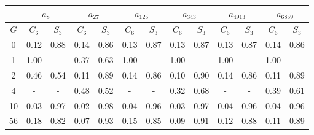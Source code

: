 \begin{table}[h]
   \begin{center}
        \begin{tabular}{c|c|c|c|c|c|c|c|c|c|c|c|c}
            \toprule
            & \multicolumn{2}{c|}{$a_{8}$} & \multicolumn{2}{c|}{$a_{27}$} & \multicolumn{2}{c|}{$a_{125}$} & \multicolumn{2}{c|}{$a_{343}$} & \multicolumn{2}{c|}{$a_{4913}$} & \multicolumn{2}{c}{$a_{6859}$} \\
            \midrule
            $G$ & $C_{6}$ & $S_{3}$ & $C_{6}$ & $S_{3}$ & $C_{6}$ & $S_{3}$ & $C_{6}$ & $S_{3}$ & $C_{6}$ & $S_{3}$ & $C_{6}$ & $S_{3}$ \\
            \midrule
            0 & 0.12 & 0.88 & 0.14 & 0.86 & 0.13 & 0.87 & 0.13 & 0.87 & 0.13 & 0.87 & 0.14 & 0.86 \\
            1 & 1.00 & - & 0.37 & 0.63 & 1.00 & - & 1.00 & - & 1.00 & - & 1.00 & - \\
            2 & 0.46 & 0.54 & 0.11 & 0.89 & 0.14 & 0.86 & 0.10 & 0.90 & 0.14 & 0.86 & 0.11 & 0.89 \\
            4 & - & - & 0.48 & 0.52 & - & - & 0.32 & 0.68 & - & - & 0.39 & 0.61 \\
            10 & 0.03 & 0.97 & 0.02 & 0.98 & 0.04 & 0.96 & 0.03 & 0.97 & 0.04 & 0.96 & 0.04 & 0.96 \\
            56 & 0.18 & 0.82 & 0.07 & 0.93 & 0.15 & 0.85 & 0.09 & 0.91 & 0.12 & 0.88 & 0.11 & 0.89 \\
            \bottomrule
        \end{tabular}
   \end{center}
\end{table}
